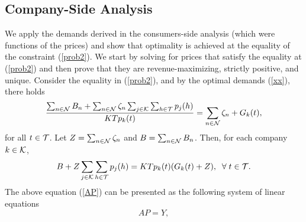 \subsection{Company-Side Analysis} 
We apply the demands derived in the consumers-side analysis (which were functions of the prices) and show that optimality is achieved at the equality of the constraint (\ref{prob2}). We start by solving for prices that satisfy the equality at (\ref{prob2}) and then prove that they are revenue-maximizing, strictly positive, and unique. 
Consider the equality in (\ref{prob2}), and by the optimal demands (\ref{xx}), there holds
$$
\frac{\sum_{n\in {\cal N}}B_n+\sum_{n\in {\cal N}}\zeta_n\sum_{j\in {\cal K}}\sum_{h\in {\cal T}}p_j(h)}{KTp_k(t)} =\sum_{n\in {\cal N}}\zeta_n + G_k(t),
$$
for all $t \in {\cal T}$. 
Let $Z=\sum_{n\in {\cal N}}\zeta_n$ and $B=\sum_{n\in {\cal N}}B_n$. Then, for each company $k \in {\cal K}$,
\begin{equation} B+Z\sum_{j\in {\cal K}}\sum_{h\in {\cal T}}p_j(h) = KTp_k(t)(G_k(t)+Z),\;\; \forall \;t \in {\cal T}.  \label{AP} \end{equation}
The above equation (\ref{AP})  can be presented as the following system of linear equations
\begin{equation}AP=Y,\label{AP2}\end{equation}
